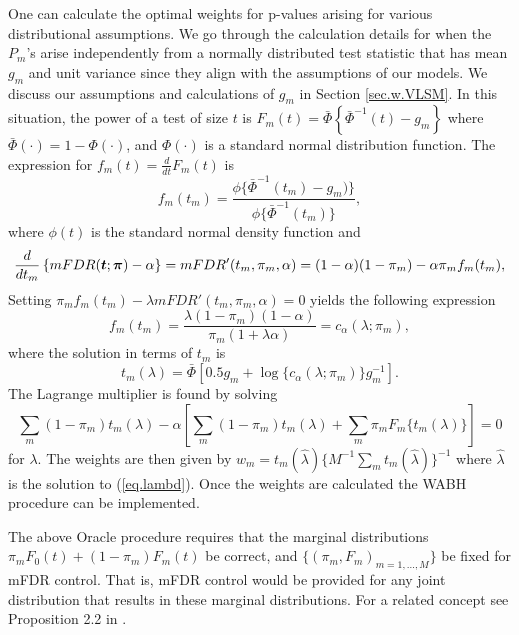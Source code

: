 \documentclass[bimj,fleqn]{w-art}
\newcommand{\mbf}[1]{\mbox{\boldmath${#1}$}}
\theoremstyle{plain}
\theoremstyle{definition}
\begin{document}
One can calculate the optimal weights for p-values arising for various distributional assumptions. We go through the calculation details for when the $P_m$'s arise independently from a normally distributed test statistic that has mean $g_m$ and unit variance since they align with the assumptions of our models. We discuss our assumptions and calculations of $g_m$ in Section \ref{sec.w.VLSM}. In this situation, the power of a test of size $t$ is $F_m(t) = \bar{\Phi}\left\{\bar{\Phi}^{-1}(t) - g_m\right\}$ where $\bar\Phi(\cdot) = 1- \Phi(\cdot)$, and $\Phi(\cdot)$ is a standard normal distribution function. The expression for $f_m(t) = \frac{d}{dt}F_m(t)$ is 
%
\begin{equation}\label{eq.f}
f_m(t_m) = \frac{\phi\{\bar\Phi^{-1}(t_m) - g_m)\}}{\phi\{\bar\Phi^{-1}(t_m)\}},
\end{equation}
%
where $\phi(t)$ is the standard normal density function and
%
$$\frac{d}{dt_m}\left\{mFDR(\mbf{t};\mbf{\pi}) - \alpha\right\} = mFDR'(t_m,\pi_m,\alpha) = (1-\alpha)(1-\pi_m)-\alpha \pi_mf_m(t_m),$$ 
% 
Setting $\pi_mf_m(t_m) - \lambda mFDR'(t_m,\pi_m,\alpha)=0$ yields the following expression
%
$$f_m(t_m)=\frac{\lambda(1-\pi_m)(1-\alpha)}{\pi_m(1+\lambda\alpha)} = c_\alpha(\lambda;\pi_m), $$
%
where the solution in terms of $t_m$ is
\begin{equation} \label{eq.t}
 t_m(\lambda) = \bar\Phi\left[0.5g_m + \log\{c_\alpha(\lambda;\pi_m)\}g_m^{-1}\right].
\end{equation}
The Lagrange multiplier is found by solving
\begin{equation}\label{eq.lambd}
\sum_m (1-\pi_m) t_m(\lambda) - \alpha\left[\sum_m (1-\pi_m) t_m(\lambda) + \sum_m \pi_m F_m\{t_m(\lambda)\}\right] = 0
\end{equation}
for $\lambda$.  The weights are then given by $w_m = t_m(\hat \lambda)\{M^{-1}\sum_m t_m(\hat \lambda)\}^{-1}$ where $\hat{\lambda}$ is the solution to (\ref{eq.lambd}). Once the weights are calculated the WABH procedure can be implemented.


The above Oracle procedure requires that the marginal distributions $\pi_m F_0(t) + (1-\pi_m)F_m(t)$ be correct, and $\{(\pi_m,F_m)_{m=1,\ldots,M}\}$ be fixed for mFDR control. That is, mFDR control would be provided for any joint distribution that results in these marginal distributions.  For a related concept see Proposition 2.2 in \cite{heller2021optimal}.  
\end{document}
